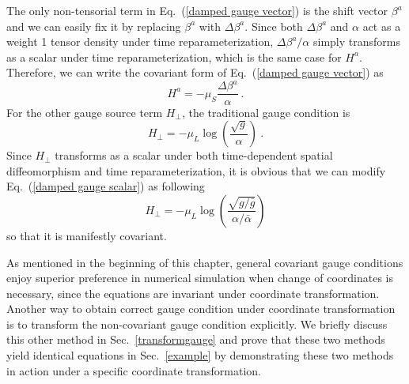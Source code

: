 The only non-tensorial term in Eq.~(\ref{damped gauge vector}) is the shift vector $\beta^{a}$ and we can easily fix it by replacing $\beta^{a}$ with $\Delta \beta^{a}$. Since both $\Delta \beta^{a}$ and $\alpha$ act as a weight 1 tensor density under time reparameterization, $\Delta \beta^{a}/\alpha$ simply transforms as a scalar under time reparameterization, which is the same case for $H^{a}$. Therefore, we can write the covariant form of Eq.~(\ref{damped gauge vector}) as
\begin{equation}\label{covariant damped gauge vector}
H^{a} = -\mu_{S}\frac{\Delta \beta^{a}}{\alpha} \ .
\end{equation}
For the other gauge source term $H_{\perp}$, the traditional gauge condition is
\begin{equation}\label{damped gauge scalar}
H_{\perp} = -\mu_{L}\log\left(\frac{\sqrt{g}}{\alpha}\right) \ .
\end{equation}
Since $H_{\perp}$ transforms as a scalar under both time-dependent spatial diffeomorphism and time reparameterization, it is obvious that we can modify Eq.~(\ref{damped gauge scalar}) as following
\begin{equation}\label{covariant damped gauge scalar}
H_{\perp} = -\mu_{L}\log\left(\frac{\sqrt{g/{\bar g}}}{\alpha/{\bar \alpha}}\right)
\end{equation} 
so that it is manifestly covariant. 

As mentioned in the beginning of this chapter, general covariant gauge conditions enjoy superior preference in numerical simulation when change of coordinates is necessary, since the equations are invariant under coordinate transformation. Another way to obtain correct gauge condition under coordinate transformation is to transform the non-covariant gauge condition explicitly. We briefly discuss this other method in Sec.~\ref{transformgauge} and prove that these two methods yield identical equations in Sec.~\ref{example} by demonstrating these two methods in action under a specific coordinate transformation. 

